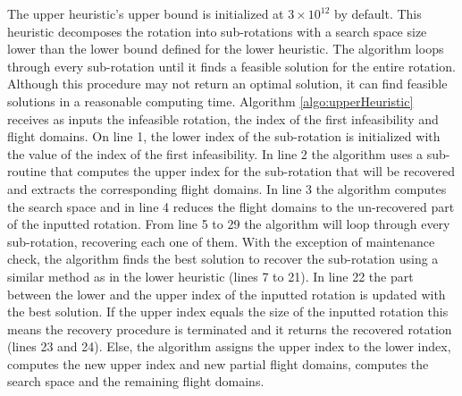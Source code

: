 The upper heuristic's upper bound is initialized at $3 \times 10^{12}$ by default. This heuristic  decomposes the rotation into sub-rotations with a search space size lower than the lower bound defined for the lower heuristic. The algorithm loops through every sub-rotation until it finds a feasible solution for the entire rotation. Although this procedure may not return an optimal solution, it can find feasible solutions in a reasonable computing time. Algorithm \ref{algo:upperHeuristic} receives as inputs the infeasible rotation, the index of the first infeasibility and flight domains. On line 1, the lower index of the sub-rotation is initialized with the value of the index of the first infeasibility. In line 2 the algorithm uses a sub-routine that computes the upper index for the sub-rotation that will be recovered and extracts the corresponding flight domains. In line 3 the algorithm computes the search space and  in line 4 reduces the flight domains to the un-recovered part of the inputted rotation. From line 5 to 29 the algorithm will loop through every sub-rotation, recovering each one of them. With the exception of maintenance check, the algorithm finds the best solution to recover the sub-rotation using a similar method as in the lower heuristic (lines 7 to 21). In line 22 the part between the lower and the upper index of the inputted rotation is updated with the best solution. If the upper index equals the size of the inputted rotation this means the recovery procedure is terminated and it returns the recovered rotation (lines 23 and 24). Else, the algorithm assigns the upper index to the lower index, computes the new upper index and new partial flight domains, computes the search space and the remaining flight domains.


